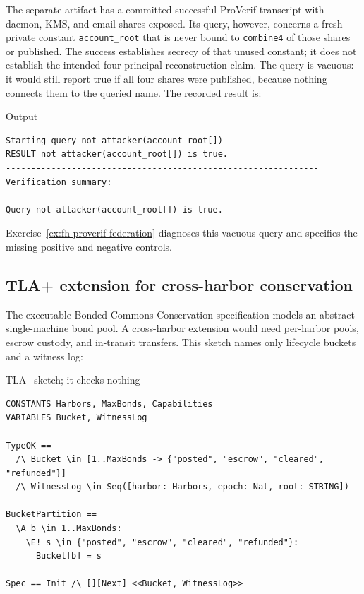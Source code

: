 \documentclass[11pt,a4paper]{article}
\theoremstyle{definition}
\theoremstyle{remark}
\begin{document}
The separate artifact  has a committed successful ProVerif transcript with daemon, KMS, and email shares exposed. Its query, however, concerns a fresh private constant \texttt{account\_root} that is never bound to \texttt{combine4} of those shares or published. The success establishes secrecy of that unused constant; it does not establish the intended four-principal reconstruction claim. The query is vacuous: it would still report true if all four shares were published, because nothing connects them to the queried name. The recorded result is:
\begin{pdlisting}{Output}{}
\begin{lstlisting}[caption={\texttt{proofs/bonded/federated/federated.pv}, actual ProVerif output},style=pdoutput]
Starting query not attacker(account_root[])
RESULT not attacker(account_root[]) is true.
--------------------------------------------------------------
Verification summary:

Query not attacker(account_root[]) is true.
\end{lstlisting}
\end{pdlisting}
Exercise~\ref{ex:fh-proverif-federation} diagnoses this vacuous query and specifies the missing positive and negative controls.

\pdexercisepointerone{\ref{ex:fh-proverif-federation}}{\pageref{ex:fh-proverif-federation}}

\subsection{TLA+ extension for cross-harbor conservation}\label{sec:fh-tla-ext}

The executable Bonded Commons Conservation specification models an abstract single-machine bond pool. A cross-harbor extension would need per-harbor pools, escrow custody, and in-transit transfers. This sketch names only lifecycle buckets and a witness log:

\begin{pdlisting}{TLA+}{sketch; it checks nothing}
\begin{lstlisting}[caption={Cross-Harbor Conservation specification (sketch; it checks nothing)},style=tlaplus]
CONSTANTS Harbors, MaxBonds, Capabilities
VARIABLES Bucket, WitnessLog

TypeOK ==
  /\ Bucket \in [1..MaxBonds -> {"posted", "escrow", "cleared", "refunded"}]
  /\ WitnessLog \in Seq([harbor: Harbors, epoch: Nat, root: STRING])

BucketPartition ==
  \A b \in 1..MaxBonds:
    \E! s \in {"posted", "escrow", "cleared", "refunded"}:
      Bucket[b] = s

Spec == Init /\ [][Next]_<<Bucket, WitnessLog>>
\end{lstlisting}
\end{pdlisting}
\end{document}
